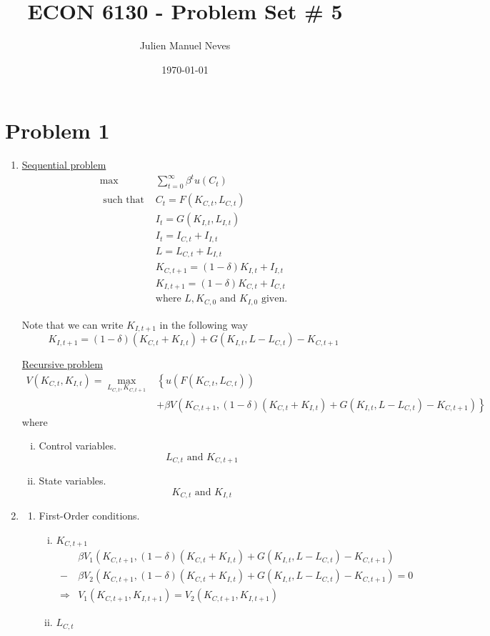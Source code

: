 \documentclass[12pt]{article}
\title{ECON 6130 - Problem Set \# 5}
\date{\today}
\author{Julien Manuel Neves}
\theoremstyle{definition}
\newcommand\st{\text{ such that }}
\begin{document}
\maketitle

\section*{Problem 1}

\begin{enumerate}[1.]
	\item 
	\underline{Sequential problem}
	\begin{align*}
		\max &\sum_{t=0}^{\infty} \beta^t u(C_t) \\
		 \st & C_t = F(K_{C,t}, L_{C,t})\\
		 & I_t = G(K_{I,t}, L_{I,t})\\
		 & I_t = I_{C,t}+ I_{I,t}\\
		 & L = L_{C,t}+ L_{I,t}\\
		 & K_{C,t+1} = (1-\delta) K_{I,t} + I_{I,t}\\
		 & K_{I,t+1} = (1-\delta) K_{C,t} + I_{C,t}\\
		 & \text{where }L, K_{C,0} \text{ and } K_{I,0} \text{ given.}
	\end{align*}
	
	Note that we can write $K_{I,t+1}$ in the following way
	\[
	K_{I,t+1} = (1-\delta)(K_{C,t}+K_{I,t})+G(K_{I,t}, L-L_{C,t})-K_{C,t+1}
	\]
	
	\underline{Recursive problem}
		\begin{align*}
	V( K_{C,t}, K_{I,t} ) = \max_{L_{C,t}, K_{C,t+1}}  & \left\lbrace u( F(K_{C,t},L_{C,t})) \right.  \\
	&\left. + \beta V(K_{C,t+1}, (1-\delta)(K_{C,t}+K_{I,t})+G(K_{I,t}, L-L_{C,t})-K_{C,t+1})\right\rbrace
	\end{align*}
	where
	\begin{enumerate}[(i)]
		\item Control variables.
		\[
		L_{C,t} \text{ and } K_{C,t+1}
		\]
		\item State variables.
		\[
		K_{C,t} \text{ and } K_{I,t}
		\]
	\end{enumerate}


	\item 
	
	
	\begin{enumerate}[(1)]
		\item First-Order conditions.
		
		\begin{enumerate}[(i)]
			\item $K_{C,t+1}$
			\begin{align*}
				&\beta V_1(K_{C,t+1}, (1-\delta)(K_{C,t}+K_{I,t})+G(K_{I,t}, L-L_{C,t})-K_{C,t+1})\\ -& \beta V_2(K_{C,t+1}, (1-\delta)(K_{C,t}+K_{I,t})+G(K_{I,t}, L-L_{C,t})-K_{C,t+1}) = 0\\
				\Rightarrow & V_1(K_{C,t+1},K_{I,t+1}) = V_2(K_{C,t+1},K_{I,t+1}) 
			\end{align*}
			\item $L_{C,t}$
			

\end{enumerate}
\end{enumerate}
\end{enumerate}
\end{document}
